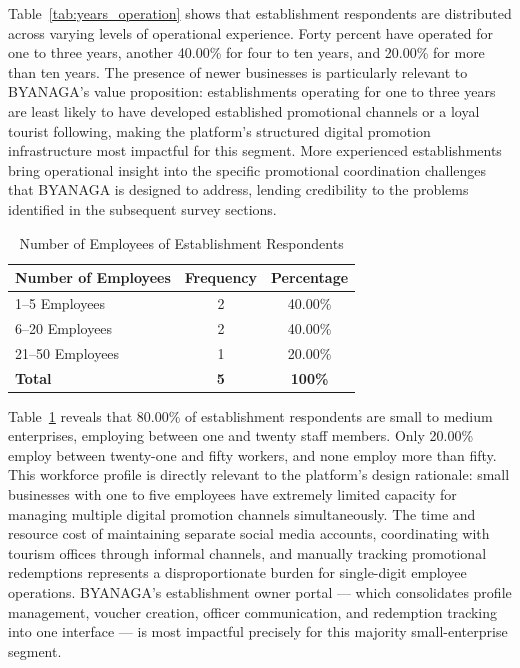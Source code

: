 \documentclass{research}
\begin{document}
Table~\ref{tab:years_operation} shows that establishment respondents are 
distributed across varying levels of operational experience. Forty percent have 
operated for one to three years, another 40.00\% for four to ten years, and 
20.00\% for more than ten years. The presence of newer businesses is particularly 
relevant to BYANAGA's value proposition: establishments operating for one to 
three years are least likely to have developed established promotional channels 
or a loyal tourist following, making the platform's structured digital promotion 
infrastructure most impactful for this segment. More experienced establishments 
bring operational insight into the specific promotional coordination challenges 
that BYANAGA is designed to address, lending credibility to the problems 
identified in the subsequent survey sections.

\begin{table}[h]
    \centering
    \begin{tabular}{|l|c|c|}
        \hline
        \textbf{Number of Employees} & \textbf{Frequency} & \textbf{Percentage} \\
        \hline
        1--5 Employees   & 2 & 40.00\% \\
        6--20 Employees  & 2 & 40.00\% \\
        21--50 Employees & 1 & 20.00\% \\
        \hline
        \textbf{Total} & \textbf{5} & \textbf{100\%} \\
        \hline
    \end{tabular}
    \caption{Number of Employees of Establishment Respondents}
    \label{tab:num_employees}
\end{table}

Table~\ref{tab:num_employees} reveals that 80.00\% of establishment respondents 
are small to medium enterprises, employing between one and twenty staff members. 
Only 20.00\% employ between twenty-one and fifty workers, and none employ more 
than fifty. This workforce profile is directly relevant to the platform's design 
rationale: small businesses with one to five employees have extremely limited 
capacity for managing multiple digital promotion channels simultaneously. The 
time and resource cost of maintaining separate social media accounts, coordinating 
with tourism offices through informal channels, and manually tracking promotional 
redemptions represents a disproportionate burden for single-digit employee 
operations. BYANAGA's establishment owner portal --- which consolidates profile 
management, voucher creation, officer communication, and redemption tracking into 
one interface --- is most impactful precisely for this majority small-enterprise 
segment.
\end{document}
